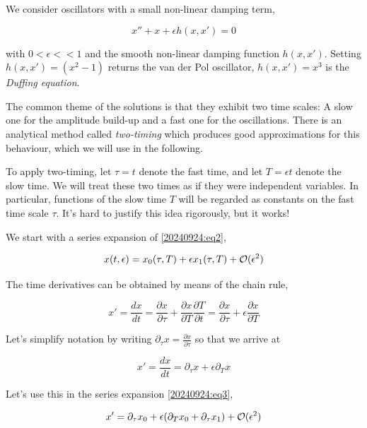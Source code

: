 We consider oscillators with a small non-linear damping term,

\begin{equation}\label{20240924:eq2}
x''  + x + \epsilon h(x, x') = 0
\end{equation}

with $0 < \epsilon << 1$ and the smooth non-linear damping function $h(x, x')$. Setting $h(x, x') = (x^2-1)$ returns the van der Pol oscillator, $h(x, x') = x^3$ is the \emph{Duffing equation}.

The common theme of the solutions is that they exhibit two time scales: A slow one for the amplitude build-up and a fast one for the oscillations. There is an analytical method called \emph{two-timing} which produces good approximations for this behaviour, which we will use in the following.

To apply two-timing, let $\tau = t$ denote the fast time, and let $T = \epsilon t$ denote the slow time. We will treat these two times as if they were independent variables. In particular, functions of the slow time $T$ will be regarded as constants on the fast time scale $\tau$. It’s hard to justify this idea rigorously, but it works!

We start with a series expansion of \eqref{20240924:eq2},

\begin{equation}\label{20240924:eq3}
x(t, \epsilon) = x_0(\tau, T) + \epsilon x_1(\tau, T) + \mathcal{O}(\epsilon^2)
\end{equation}

The time derivatives can be obtained by means of the chain rule,

\begin{equation*}
x' = \frac{dx}{dt} = \frac{\partial x}{\partial \tau} + \frac{\partial x}{\partial T} \frac{\partial T}{\partial t} = \frac{\partial x}{\partial \tau} + \epsilon \frac{\partial x}{\partial T}
\end{equation*}

Let's simplify notation by writing $\partial_\tau x = \frac{\partial x}{\partial \tau}$ so that we arrive at

\begin{equation*}
x' = \frac{dx}{dt} = \partial_\tau x + \epsilon \partial_T x
\end{equation*}

Let's use this in the series expansion \eqref{20240924:eq3},

\begin{equation}\label{20240924:eq10}
x' = \partial_\tau x_0 + \epsilon ( \partial_T x_0 + \partial_\tau x_1 ) + \mathcal{O}(\epsilon^2)
\end{equation}

